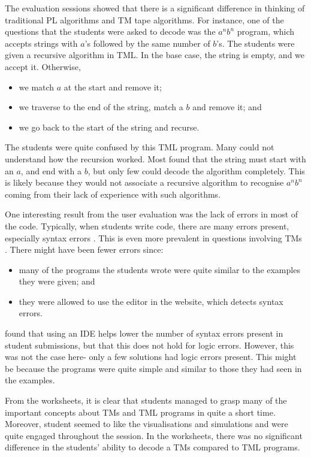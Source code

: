 The evaluation sessions showed that there is a significant difference in thinking of traditional PL algorithms and TM tape algorithms. For instance, one of the questions that the students were asked to decode was the $a^n b^n$ program, which accepts strings with $a$'s followed by the same number of $b$'s. The students were given a recursive algorithm in TML. In the base case, the string is empty, and we accept it. Otherwise,
\begin{itemize}
    \item we match $a$ at the start and remove it;
    \item we traverse to the end of the string, match a $b$ and remove it; and
    \item we go back to the start of the string and recurse.
\end{itemize}
The students were quite confused by this TML program. Many could not understand how the recursion worked. Most found that the string must start with an $a$, and end with a $b$, but only few could decode the algorithm completely. This is likely because they would not associate a recursive algorithm to recognise $a^n b^n$ coming from their lack of experience with such algorithms.

One interesting result from the user evaluation was the lack of errors in most of the code. Typically, when students write code, there are many errors present, especially syntax errors \citep{corley2020paper}. This is even more prevalent in questions involving TMs \citep{rodger2006jflap}. There might have been fewer errors since:
\begin{itemize}
    \item many of the programs the students wrote were quite similar to the examples they were given; and
    \item they were allowed to use the editor in the website, which detects syntax errors.
\end{itemize}
\citet{corley2020paper} found that using an IDE helps lower the number of syntax errors present in student submissions, but that this does not hold for logic errors. However, this was not the case here- only a few solutions had logic errors present. This might be because the programs were quite simple and similar to those they had seen in the examples.

From the worksheets, it is clear that students managed to grasp many of the important concepts about TMs and TML programs in quite a short time. Moreover, student seemed to like the visualisations and simulations and were quite engaged throughout the session. In the worksheets, there was no significant difference in the students' ability to decode a TMs compared to TML programs.

